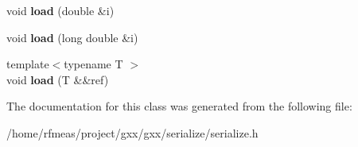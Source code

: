 \begin{DoxyCompactItemize}
\item 
void {\bfseries load} (double \&i)\hypertarget{classgxx_1_1archive_1_1binary__deserializer__basic_ac14166dee2a76b5a0f88e2058b459af4}{}\label{classgxx_1_1archive_1_1binary__deserializer__basic_ac14166dee2a76b5a0f88e2058b459af4}

\item 
void {\bfseries load} (long double \&i)\hypertarget{classgxx_1_1archive_1_1binary__deserializer__basic_a109528082168ec879a19e7635c281cb1}{}\label{classgxx_1_1archive_1_1binary__deserializer__basic_a109528082168ec879a19e7635c281cb1}

\item 
{\footnotesize template$<$typename T $>$ }\\void {\bfseries load} (T \&\&ref)\hypertarget{classgxx_1_1archive_1_1binary__deserializer__basic_a3115894844b9d90039b1bd5383d23843}{}\label{classgxx_1_1archive_1_1binary__deserializer__basic_a3115894844b9d90039b1bd5383d23843}

\end{DoxyCompactItemize}


The documentation for this class was generated from the following file\+:\begin{DoxyCompactItemize}
\item 
/home/rfmeas/project/gxx/gxx/serialize/serialize.\+h\end{DoxyCompactItemize}
